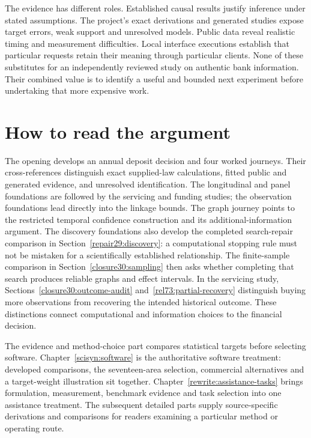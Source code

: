 The evidence has different roles. Established causal results justify inference
under stated assumptions. The project's exact derivations and generated studies
expose target errors, weak support and unresolved models. Public data reveal
realistic timing and measurement difficulties. Local interface executions
establish that particular requests retain their meaning through particular
clients. None of these substitutes for an independently reviewed study on
authentic bank information. Their combined value is to identify a useful and
bounded next experiment before undertaking that more expensive work.

\chapter*{How to read the argument}

The opening develops an annual deposit decision and four worked journeys.
Their cross-references distinguish exact supplied-law calculations, fitted
public and generated evidence, and unresolved identification. The longitudinal
and panel foundations are followed by the servicing and funding studies;
the observation foundations lead directly into the linkage bounds. The graph
journey points to the restricted temporal confidence construction and its
additional-information argument. The discovery foundations also develop the
completed search-repair comparison in Section~\ref{repair29:discovery}: a
computational stopping rule must not be mistaken for a scientifically
established relationship. The finite-sample comparison in
Section~\ref{closure30:sampling} then asks whether completing that search
produces reliable graphs and effect intervals. In the servicing study,
Sections~\ref{closure30:outcome-audit} and~\ref{rel73:partial-recovery}
distinguish buying more observations from recovering the intended historical
outcome. These distinctions connect computational and information choices
to the financial decision.

The evidence and method-choice part compares statistical targets before
selecting software. Chapter~\ref{scisyn:software} is the authoritative
software treatment: developed comparisons, the seventeen-area selection,
commercial alternatives and a target-weight illustration sit together.
Chapter~\ref{rewrite:assistance-tasks} brings formulation, measurement,
benchmark evidence and task selection into one assistance treatment.
The subsequent detailed parts supply source-specific derivations and
comparisons for readers examining a particular method or operating route.

